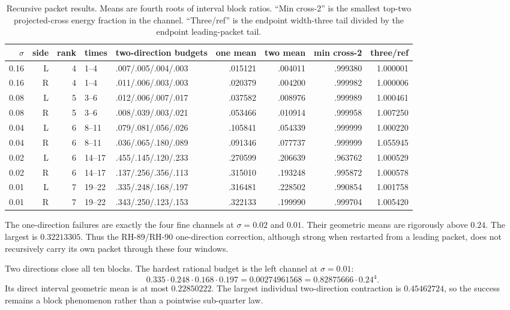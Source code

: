 \documentclass[11pt]{article}
\theoremstyle{definition}
\theoremstyle{remark}
\begin{document}
\begin{table}[ht]
\centering
\scriptsize
\begin{tabular}{rrrllrrrr}
\toprule
$\sigma$ & side & rank & times & two-direction budgets & one mean & two mean & min cross-2 & three/ref\\
\midrule
0.16 & L & 4 & 1--4 & .007/.005/.004/.003 & .015121 & .004011 & .999380 & 1.000001\\
0.16 & R & 4 & 1--4 & .011/.006/.003/.003 & .020379 & .004200 & .999982 & 1.000006\\
0.08 & L & 5 & 3--6 & .012/.006/.007/.017 & .037582 & .008976 & .999989 & 1.000461\\
0.08 & R & 5 & 3--6 & .008/.039/.003/.021 & .053466 & .010914 & .999958 & 1.007250\\
0.04 & L & 6 & 8--11 & .079/.081/.056/.026 & .105841 & .054339 & .999999 & 1.000220\\
0.04 & R & 6 & 8--11 & .036/.065/.180/.089 & .091346 & .077737 & .999999 & 1.055945\\
0.02 & L & 6 & 14--17 & .455/.145/.120/.233 & .270599 & .206639 & .963762 & 1.000529\\
0.02 & R & 6 & 14--17 & .137/.256/.356/.113 & .315010 & .193248 & .995872 & 1.000578\\
0.01 & L & 7 & 19--22 & .335/.248/.168/.197 & .316481 & .228502 & .990854 & 1.001758\\
0.01 & R & 7 & 19--22 & .343/.250/.123/.153 & .322133 & .199990 & .999704 & 1.005420\\
\bottomrule
\end{tabular}
\caption{Recursive packet results.  Means are fourth roots of interval block
ratios.  ``Min cross-2'' is the smallest top-two projected-cross energy
fraction in the channel.  ``Three/ref'' is the endpoint width-three tail
divided by the endpoint leading-packet tail.}
\label{tab:channels}
\end{table}

The one-direction failures are exactly the four fine channels at
$\sigma=0.02$ and $0.01$.  Their geometric means are rigorously above $0.24$.
The largest is $0.32213305$.  Thus the RH-89/RH-90 one-direction correction,
although strong when restarted from a leading packet, does not recursively
carry its own packet through these four windows.

Two directions close all ten blocks.  The hardest rational budget is the
left channel at $\sigma=0.01$:
\[
 0.335\cdot0.248\cdot0.168\cdot0.197
 =0.00274961568
 =0.82875666\cdot0.24^4.
\]
Its direct interval geometric mean is at most $0.22850222$.  The largest
individual two-direction contraction is $0.45462724$, so the success remains
a block phenomenon rather than a pointwise sub-quarter law.
\end{document}
